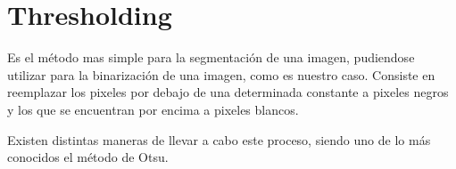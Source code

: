 \section{Thresholding}

Es el método mas simple para la segmentación de una imagen, pudiendose utilizar para la binarización de una imagen, como es nuestro caso. Consiste en reemplazar los pixeles por debajo de una determinada constante a pixeles negros y los que se encuentran por encima a pixeles blancos.

Existen distintas maneras de llevar a cabo este proceso, siendo uno de lo más conocidos el método de Otsu.\cite{otsu}